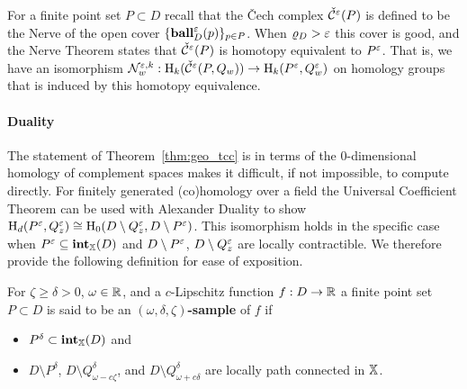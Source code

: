 
For a finite point set $P\subset D$ recall that the \v Cech complex $\check{\mathcal{C}}^\varepsilon(P)$ is defined to be the Nerve of the open cover $\{\mathbf{ball}_D^\varepsilon(p)\}_{p\in P}$.
When $\varrho_D > \varepsilon$ this cover is good, and the Nerve Theorem states that $\check{\mathcal{C}}^\varepsilon(P)$ is homotopy equivalent to $P^\varepsilon$.
That is, we have an isomorphism $\mathcal{N}_w^{\varepsilon, k} : \mathrm{H}_k(\check{\mathcal{C}}^\varepsilon(P,Q_w))\to \mathrm{H}_k(P^\varepsilon, Q_w^\varepsilon)$ on homology groups that is induced by this homotopy equivalence.%

\paragraph{Duality}

The statement of Theorem~\ref{thm:geo_tcc} is in terms of the $0$-dimensional homology of complement spaces makes it difficult, if not impossible, to compute directly.
For finitely generated (co)homology over a field the Universal Coefficient Theorem can be used with Alexander Duality to show $\mathrm{H}_d(P^\varepsilon,Q_z^\varepsilon)\cong\mathrm{H}_0(D\setminus Q_z^\varepsilon, D\setminus P^\varepsilon)$.
This isomorphism holds in the specific case when $P^\varepsilon\subseteq \mathbf{int}_{\mathbb{X}}(D)$ and $D\setminus P^\varepsilon$, $D\setminus Q_z^\varepsilon$ are locally contractible.
We therefore provide the following definition for ease of exposition.
\begin{definition}
  For $\zeta\geq \delta > 0$, $\omega\in\mathbb{R}$, and a $c$-Lipschitz function $f: D\to \mathbb{R}$ a finite point set $P\subset D$ is said to be an \textbf{$(\omega, \delta, \zeta)$-sample} of $f$ if \begin{itemize}
    \item $P^\delta\subset\mathbf{int}_{\mathbb{X}}(D)$ and
    \item $D\setminus P^\delta$, $D\setminus Q_{\omega-c\zeta}^\delta$, and $D\setminus Q_{\omega+c\delta}^\delta$ are locally path connected in $\mathbb{X}$.
  \end{itemize}
\end{definition}

